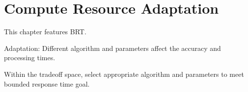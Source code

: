 \documentclass[thesis.tex]{subfiles}
\begin{document}
\chapter{Compute Resource Adaptation}
\label{cha:comp-reso-adapt}

This chapter features BRT.

Adaptation: Different algorithm and parameters affect the accuracy and
processing times.

Within the tradeoff space, select appropriate algorithm and parameters to meet
bounded response time goal.








\end{document}
